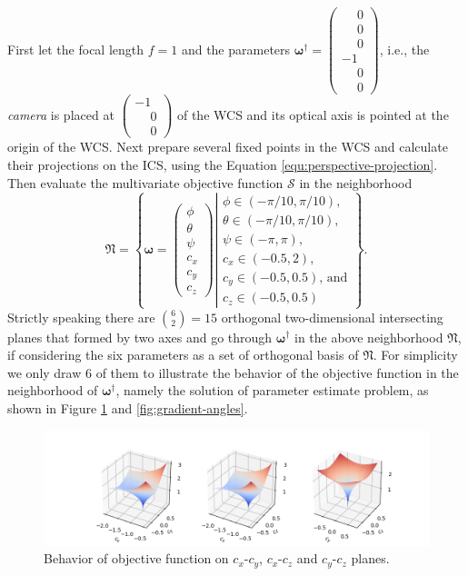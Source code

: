 \documentclass{article}
\newcommand{\bomega}{\boldsymbol{\omega}}
\begin{document}
First let the focal length $f=1$ and the parameters
$\bomega^\dagger=\begin{pmatrix}\phantom{-}0 \\ \phantom{-}0 \\ \phantom{-}0 \\ -1 \\ \phantom{-}0 \\ \phantom{-}0 \end{pmatrix}$,
i.e., the \emph{camera} is placed at
$\begin{pmatrix} -1 \\ \phantom{-}0 \\ \phantom{-}0 \end{pmatrix}$
of the WCS and its optical axis is pointed at the origin of the WCS.
Next prepare several fixed points in the WCS and calculate their projections on the ICS, using the Equation \ref{equ:perspective-projection}.
Then evaluate the multivariate objective function $\mathcal{S}$ in the neighborhood
\[\mathfrak{N} = \left\{
\bomega=\begin{pmatrix}\phi \\ \theta \\ \psi \\ c_x \\ c_y \\ c_z \end{pmatrix}
\left|\begin{array}{l}
\phi   \in (-\pi/10, \pi/10)\text{,} \\
\theta \in (-\pi/10, \pi/10)\text{,} \\
\psi   \in (-\pi, \pi)\text{,} \\
c_x    \in (-0.5,   2)\text{,} \\
c_y    \in (-0.5, 0.5)\text{, and} \\
c_z    \in (-0.5, 0.5)
\end{array}\right.
\right\}\text{.}\]
Strictly speaking there are ${6 \choose 2} = 15$ orthogonal two-dimensional intersecting planes that formed by two axes and
go through $\bomega^\dagger$ in the above neighborhood $\mathfrak{N}$,
if considering the six parameters as a set of orthogonal basis of $\mathfrak{N}$.
For simplicity we only draw 6 of them to illustrate the behavior of the objective function in the neighborhood of $\bomega^\dagger$,
namely the solution of parameter estimate problem, as shown in Figure \ref{fig:gradient-xyz} and \ref{fig:gradient-angles}.

\begin{figure}[h]
  \centering
  \includegraphics[width=\linewidth]{figures/gradient-xyz.png}
  \caption{Behavior of objective function on $c_x$-$c_y$, $c_x$-$c_z$ and $c_y$-$c_z$ planes.}
  \label{fig:gradient-xyz}
\end{figure}
\end{document}
